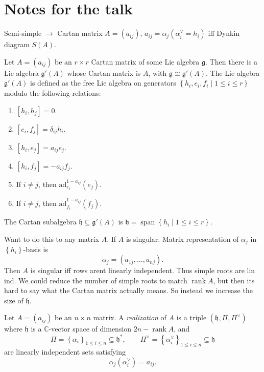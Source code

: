 \documentclass[11pt, letterpaper]{article}
\theoremstyle{plain}
\begin{document}
\newpage
\section{Notes for the talk}

Semi-simple $\to $ Cartan matrix $A = (a_{ij} )$, $a_{ij} =\alpha _j(\alpha _i^\vee =h_i)$ iff Dynkin diagram $S(A)$.

\begin{theorem}\label{thm:6-1}
	Let $A=(a_{ij} )$ be an $r\times r$ Cartan matrix of some Lie algebra $\mathfrak{g} $. Then there is a Lie algebra $\mathfrak{g}'(A) $ whose Cartan matrix is $A$, with $\mathfrak{g} \cong \mathfrak{g} '(A)$. The Lie algebra $\mathfrak{g} '(A)$ is defined as the free Lie algebra on generators $\left\{ h_i,e_i,f_i\mid 1\leq i\leq r \right\} $ modulo the following relations:
	\begin{enumerate}[label=(\arabic*), align=right]
		\item $[h_i,h_j]=0$.
		\item $[e_i,f_j]=\delta _{ij} h_i$.
		\item $[h_i,e_j]=a_{ij} e_j$.
		\item $[h_i,f_j]=-a_{ij} f_j$.
		\item If $i\neq j$, then $\mathrm{ad}_{e_i} ^{1-a_{ij} } (e_j)$.
		\item If $i\neq j$, then $\mathrm{ad}_{f_i} ^{1-a_{ij} } (f_j)$.
	\end{enumerate}
The Cartan subalgebra $\mathfrak{h} \subseteq \mathfrak{g}'(A) $ is $\mathfrak{h} =\operatorname{span} \left\{ h_i\mid 1\leq i\leq r \right\} $. 
\end{theorem}

Want to do this to any matrix $A$. If $A$ is singular. Matrix representation of $\alpha _j$ in $\left\{ h_i \right\} $-basis is
\[
	\alpha _j = (a_{1j} , \ldots , a_{nj} )
.\]
Then $A$ is singular iff rows arent linearly independent. Thus simple roots are lin ind. We could reduce the number of simple roots to match $\operatorname{rank} A$, but then its hard to say what the Cartan matrix actually means. So instead we increase the size of $\mathfrak{h} $.



\begin{definition}\label{dfn:6-2}
	Let $A=(a_{ij} )$ be an $n\times n$ matrix. A \emph{realization} of $A$ is a triple $(\mathfrak{h} ,\Pi ,\Pi ^\vee )$ where $\mathfrak{h} $ is a $\mathbb{C} $-vector space of dimension $2n-\operatorname{rank } A$, and
	\[
		\Pi =\left\{ \alpha _i \right\}_{1\leq i\leq n} \subseteq \mathfrak{h} ^*,\qquad \Pi ^\vee =\left\{ \alpha ^\vee _i \right\}_{1\leq i\leq n} \subseteq \mathfrak{h} 
	\]
	are linearly independent sets satisfying
	\[
		\alpha _j(\alpha ^\vee _i)=a_{ij} .
	\]
\end{definition}
\end{document}
